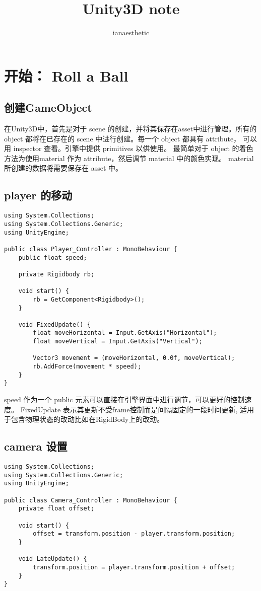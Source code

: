\documentclass[10pt, a4paper]{article}
\author{ianaesthetic}
\title{Unity3D note}
\begin{document}
    \maketitle
    \newpage
    \section{开始： Roll a Ball}
        \subsection{创建GameObject} 
            在Unity3D中，首先是对于 scene 的创建，并将其保存在asset中进行管理。所有的 object 都将在已存在的 scene 中进行创建。每一个 object 都具有 attribute， 可以用 inspector 查看。引擎中提供 primitives 以供使用。 最简单对于 object 的着色方法为使用material 作为 attribute，然后调节 material 中的颜色实现。 material 所创建的数据将需要保存在 asset 中。 
        \subsection{player 的移动}
\begin{lstlisting}
using System.Collections; 
using System.Collections.Generic;
using UnityEngine;

public class Player_Controller : MonoBehaviour {
    public float speed;    

    private Rigidbody rb; 

    void start() {
        rb = GetComponent<Rigidbody>();
    }

    void FixedUpdate() {
        float moveHorizontal = Input.GetAxis("Horizontal");
        float moveVertical = Input.GetAxis("Vertical"); 

        Vector3 movement = (moveHorizontal, 0.0f, moveVertical); 
        rb.AddForce(movement * speed);
    }
}
\end{lstlisting}

            speed 作为一个 public 元素可以直接在引擎界面中进行调节，可以更好的控制速度。 FixedUpdate 表示其更新不受frame控制而是间隔固定的一段时间更新, 适用于包含物理状态的改动比如在RigidBody上的改动。
        \subsection{camera 设置}
\begin{lstlisting}
using System.Collections; 
using System.Collections.Generic;
using UnityEngine;

public class Camera_Controller : MonoBehaviour {
    private float offset; 

    void start() {
        offset = transform.position - player.transform.position;
    }

    void LateUpdate() {
        transform.position = player.transform.position + offset; 
    }
}
\end{lstlisting}
\end{document}
